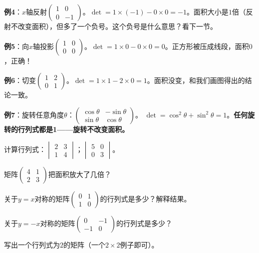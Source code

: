 \documentclass[a4paper,12pt]{ctexart}
\begin{document}
\textbf{例4}：$x$轴反射$\begin{pmatrix}1&0\\0&-1\end{pmatrix}$。$\det=1\times(-1)-0\times0=-1$。面积大小是$1$倍（反射不改变面积），但多了一个负号。这个负号是什么意思？看下一节。

\textbf{例5}：向$x$轴投影$\begin{pmatrix}1&0\\0&0\end{pmatrix}$。$\det=1\times0-0\times0=0$。正方形被压成线段，面积$0$，正确！

\textbf{例6}：切变$\begin{pmatrix}1&2\\0&1\end{pmatrix}$。$\det=1\times1-2\times0=1$。面积没变，和我们画图得出的结论一致。

\textbf{例7}：旋转任意角度$\theta$：$\begin{pmatrix}\cos\theta&-\sin\theta\\\sin\theta&\cos\theta\end{pmatrix}$。
$\det=\cos^2\theta+\sin^2\theta=1$。\textbf{任何旋转的行列式都是1——旋转不改变面积。}

\begin{exercise}[行列式计算练习]
\item 计算行列式：$\begin{vmatrix}2&3\\1&4\end{vmatrix}$；$\begin{vmatrix}5&0\\0&3\end{vmatrix}$。
\item 矩阵$\begin{pmatrix}4&1\\2&3\end{pmatrix}$把面积放大了几倍？
\item 关于$y=x$对称的矩阵$\begin{pmatrix}0&1\\1&0\end{pmatrix}$的行列式是多少？解释结果。
\item 关于$y=-x$对称的矩阵$\begin{pmatrix}0&-1\\-1&0\end{pmatrix}$的行列式是多少？
\item 写出一个行列式为$2$的矩阵（一个$2\times2$例子即可）。
\end{exercise}
\end{document}
